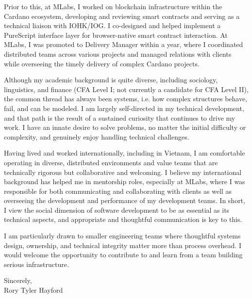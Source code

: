 \documentclass[10.5pt]{article}
\begin{document}
Prior to this, at MLabs, I worked on blockchain infrastructure within the Cardano ecosystem, developing and reviewing smart contracts and serving as a technical liaison with IOHK/IOG. I co-designed and helped implement a PureScript interface layer for browser-native smart contract interaction. At MLabs, I was promoted to Delivery Manager within a year, where I coordinated distributed teams across various projects and managed relations with clients while overseeing the timely delivery of complex Cardano projects.

Although my academic background is quite diverse, including sociology, linguistics, and finance (CFA Level I; not currently a candidate for CFA Level II), the common thread has always been systems, i.e. how complex structures behave, fail, and can be modeled. I am largely self-directed in my technical development, and that path is the result of a sustained curiosity that continues to drive my work. I have an innate desire to solve problems, no matter the initial difficulty or complexity, and genuinely enjoy handling technical challenges.

Having lived and worked internationally, including in Vietnam, I am comfortable operating in diverse, distributed environments and value teams that are technically rigorous but collaborative and welcoming. I believe my international background has helped me in mentorship roles, especially at MLabs, where I was responsible for both communicating and collaborating with clients as well as overseeing the development and performance of my development teams. In short, I view the social dimension of software development to be as essential as its technical aspects, and appropriate and thoughtful communication is key to this.

I am particularly drawn to smaller engineering teams where thoughtful systems design, ownership, and technical integrity matter more than process overhead. I would welcome the opportunity to contribute to and learn from a team building serious infrastructure.

\vspace{12pt}

Sincerely, \\
Rory Tyler Hayford
\end{document}
